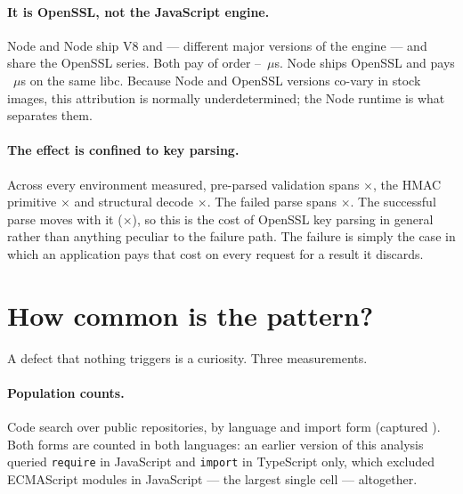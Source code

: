 \documentclass[pdflatex,sn-basic,twocolumn]{sn-jnl}
\begin{document}
\paragraph{It is OpenSSL, not the JavaScript engine.} Node \NodeEighteenNodeMajor{}
and Node \NodeTwentyNodeMajor{} ship V8 \NodeEighteenVeight{} and
\NodeTwentyVeight{} --- different major versions of the engine --- and share the
OpenSSL \NodeEighteenOpensslSeries{} series. Both pay of order
\NodeEighteenProbeThrows--\NodeTwentyProbeThrows~$\mu$s. Node \NodeTwentySixMuslNodeMajor{} ships OpenSSL
\NodeTwentySixMuslOpensslSeries{} and pays \NodeTwentySixMuslProbeThrows~$\mu$s on the same libc. Because Node
and OpenSSL versions co-vary in stock images, this attribution is normally
underdetermined; the Node \NodeTwentyNodeMajor{} runtime is what separates them.

\paragraph{The effect is confined to key parsing.} Across every environment
measured, pre-parsed validation spans \SpanJwtPreparsed$\times$, the HMAC
primitive \SpanHmacString$\times$ and structural decode \SpanDecodeOnly$\times$.
The failed parse spans \SpanProbeThrows$\times$. The successful parse moves with
it (\SpanProbeSucceeds$\times$), so this is the cost of OpenSSL \NodeEighteenOpensslSeries{} key parsing
in general rather than anything peculiar to the failure path. The failure is
simply the case in which an application pays that cost on every request for a
result it discards.

\section{How common is the pattern?}\label{sec:prevalence}

A defect that nothing triggers is a curiosity. Three measurements.

\paragraph{Population counts.} Code search over public repositories, by language
and import form (captured \PopCapturedAt). Both forms are counted in both
languages: an earlier version of this analysis queried \texttt{require} in
JavaScript and \texttt{import} in TypeScript only, which excluded ECMAScript
modules in JavaScript --- the largest single cell --- altogether.
\end{document}
